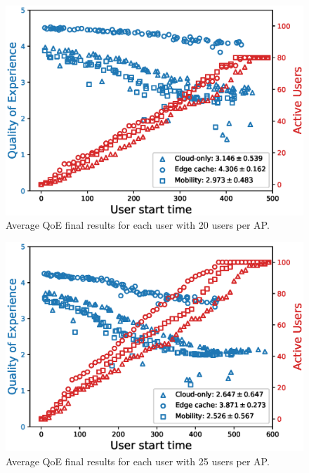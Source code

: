 \begin{figure}[!h]
    \centering
    \includegraphics[width=\linewidth]{images/UserQoExUserStartTime20users-2.eps}
    \vspace{-0.4cm}
    \caption{Average QoE final results for each user with 20 users per AP.}
    \label{fig:exp-setup-20}
\end{figure}

\begin{figure}[!h]
    \centering
    \includegraphics[width=\linewidth]{images/UserQoExUserStartTime25users-2.eps}
    \vspace{-0.4	cm}
    \caption{Average QoE final results for each user with 25 users per AP.}
    \label{fig:exp-setup-25}
\end{figure}

